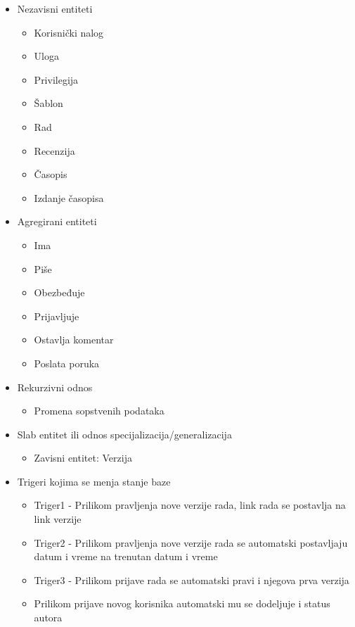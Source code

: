\documentclass[a4paper]{article}
\begin{document}
\begin{itemize}
    \item Nezavisni entiteti
    \begin{itemize}
        \item Korisnički nalog
        \item Uloga
        \item Privilegija
        \item Šablon
        \item Rad
        \item Recenzija
        \item Časopis
        \item Izdanje časopisa
    \end{itemize}
    \item Agregirani entiteti
    \begin{itemize}
        \item Ima
        \item Piše
        \item Obezbeđuje
        \item Prijavljuje
        \item Ostavlja komentar
        \item Poslata poruka
    \end{itemize}
    \item Rekurzivni odnos
    \begin{itemize}
        \item Promena sopstvenih podataka
    \end{itemize}
    \item Slab entitet ili odnos specijalizacija/generalizacija
    \begin{itemize}
        \item Zavisni entitet: Verzija
    \end{itemize}
    \item Trigeri kojima se menja stanje baze
    \begin{itemize}
        \item Triger1 - Prilikom pravljenja nove verzije rada, link rada se postavlja na link verzije
        \item Triger2 - Prilikom pravljenja nove verzije rada se automatski postavljaju datum i vreme na trenutan datum i vreme
        \item Triger3 - Prilikom prijave rada se automatski pravi i njegova prva verzija
        \item Prilikom prijave novog korisnika automatski mu se dodeljuje i status autora
    \end{itemize}
\end{itemize}
\end{document}
